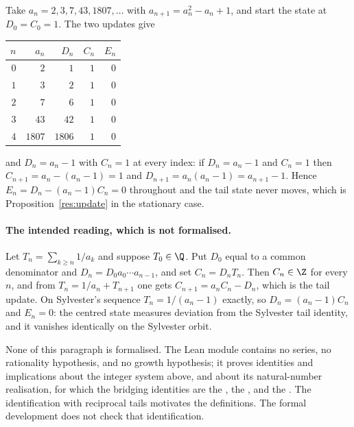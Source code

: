 \documentclass[11pt]{article}
\begin{document}
\begin{example}\label{ex:sylvester}
Take $a_n=2,3,7,43,1807,\ldots$ with $a_{n+1}=a_n^{2}-a_n+1$, and start the
state at $D_0=C_0=1$.  The two updates give

\begin{center}
\begin{tabular}{@{}rrrrr@{}}
\toprule
$n$ & $a_n$ & $D_n$ & $C_n$ & $E_n$\\
\midrule
$0$ & $2$ & $1$ & $1$ & $0$\\
$1$ & $3$ & $2$ & $1$ & $0$\\
$2$ & $7$ & $6$ & $1$ & $0$\\
$3$ & $43$ & $42$ & $1$ & $0$\\
$4$ & $1807$ & $1806$ & $1$ & $0$\\
\bottomrule
\end{tabular}
\end{center}

\noindent and $D_n=a_n-1$ with $C_n=1$ at every index: if $D_n=a_n-1$ and
$C_n=1$ then $C_{n+1}=a_n-(a_n-1)=1$ and $D_{n+1}=a_n(a_n-1)=a_{n+1}-1$.
Hence $E_n=D_n-(a_n-1)C_n=0$ throughout and the tail state never moves, which
is Proposition~\ref{res:update} in the stationary case.
\end{example}

\paragraph{The intended reading, which is not formalised.}
Let $T_n=\sum_{k\ge n}1/a_k$ and suppose $T_0\in\Q$.  Put $D_0$ equal to a
common denominator and $D_n=D_0a_0\cdots a_{n-1}$, and set $C_n=D_nT_n$.  Then
$C_n\in\Z$ for every $n$, and from $T_n=1/a_n+T_{n+1}$ one gets
$C_{n+1}=a_nC_n-D_n$, which is the tail update.  On Sylvester's sequence
$T_n=1/(a_n-1)$ exactly, so $D_n=(a_n-1)C_n$ and $E_n=0$: the centred state
measures deviation from the Sylvester tail identity, and it vanishes
identically on the Sylvester orbit.

None of this paragraph is formalised.  The Lean module contains no series, no
rationality hypothesis, and no growth hypothesis; it proves identities and
implications about the integer system above, and about its natural-number
realisation, for which the bridging identities are the
, the
, and the
.  The identification with reciprocal tails motivates the
definitions.  The formal development does not check that identification.
\end{document}
